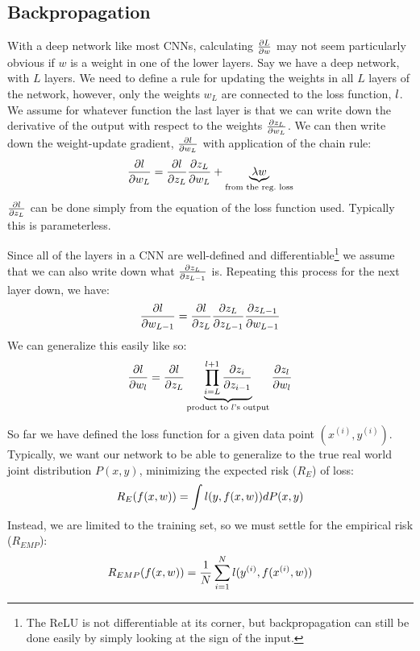 \subsection{Backpropagation}
  With a deep network like most CNNs, calculating $\frac{\partial L}{\partial w}$ may not seem
  particularly obvious if $w$ is a weight in one of the lower layers.  Say we
  have a deep network, with $L$ layers. We need to define a rule for updating
  the weights in all $L$ layers of the network, however, only the weights $w_L$
  are connected to the loss function, $l$. We assume for whatever function
  the last layer is that we can write down the derivative of the output with
  respect to the weights $\frac{\partial z_{L}}{\partial w_{L}}$. We can then write down the
  weight-update gradient, $\frac{\partial l}{\partial w_L}$ with application of the chain rule:
  \begin{equation}
    \frac{\partial l}{\partial w_L} = \frac{\partial l}{\partial z_L} \frac{\partial z_L}{\partial w_L} + \underbrace{\lambda
    w}_{\text{from the reg.\ loss}}
  \end{equation}
  $\frac{\partial l}{\partial z_L}$ can be done simply from the equation of the loss function
  used. Typically this is parameterless.

  Since all of the layers in a CNN are well-defined and
  differentiable\footnote{The ReLU is not differentiable at its corner, but
  backpropagation can still be done easily by simply looking at the sign of the
  input.} we assume that we can also write down what $\frac{\partial z_L}{\partial z_{L-1}}$ is.
  Repeating this process for the next layer down, we have:
  \begin{equation}
    \frac{\partial l}{\partial w_{L-1}}
    = \frac{\partial l}{\partial z_L}\frac{\partial z_L}{\partial z_{L-1}}\frac{\partial z_{L-1}}{\partial w_{L-1}}
  \end{equation}
  We can generalize this easily like so:
  \begin{equation}
    \frac{\partial l}{\partial w_{l}}
    = \frac{\partial l}{\partial z_L} \underbrace{\prod_{i=L}^{l+1}
    \frac{\partial z_i}{\partial z_{i-1}}}_{\text{product to $l$'s output}} 
    \frac{\partial z_{l}}{\partial w_{l}}
  \end{equation}

  So far we have defined the loss function for a given data point $(x^{(i)},
  y^{(i)})$. Typically, we want our network to be able to generalize to the
  true real world joint distribution $P(x,y)$, minimizing the expected risk ($R_E$) of
  loss:
  \begin{equation}
    R_E(f(x,w)) = \int l(y,f(x,w)) dP(x,y)
  \end{equation}
  Instead, we are limited to the training set, so we must settle for the
  empirical risk ($R_{EMP}$):
  \begin{equation}
    R_{EMP}(f(x,w)) = \frac{1}{N} \sum_{i=1}^{N} l( y^{(i)},f(x^{(i)}, w))
    \label{eq:empirical_risk}
  \end{equation}

